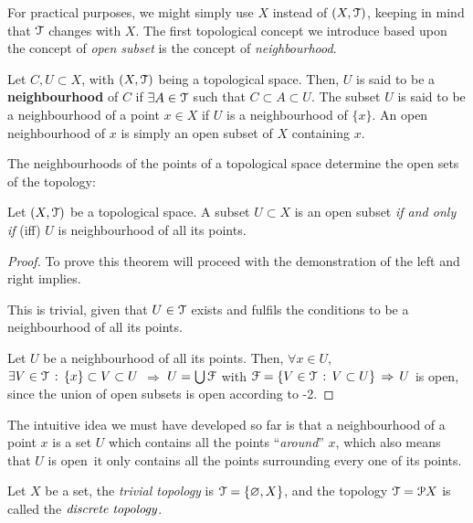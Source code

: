 For practical purposes, we might simply use $X$ instead of $(X, \EuScript{T})$, keeping in mind
that $\EuScript{T}$ changes with $X$.
The first topological concept we introduce based upon the concept of \emph{open subset} is
the concept of \emph{neighbourhood}.

\begin{definition}
	\label{def:neighbourhood}
	Let $C, U\subset X$, with $(X, \EuScript{T})$ being a topological space.
	Then, $U$ is said to
	be a \textbf{neighbourhood} of $C$ if $\exists A\in\EuScript{T}$ such that $C\subset A \subset U$.
	The subset $U$ is said to be a neighbourhood of a point $x\in X$ if $U$ is a
	neighbourhood of $\{x\}$.
	An open neighbourhood of $x$ is simply an open subset of $X$ containing $x$.
\end{definition}

The neighbourhoods of the points of a topological space determine the open sets of the topology:

\begin{theorem}
	\label{th:open-subset-neighbourhood}
	Let $(X, \EuScript{T})$ be a topological space.
	A subset $U\subset X$ is an open subset \emph{if and only if} (iff) $U$ is neighbourhood of all its points.
\end{theorem}

\begin{proof} To prove this theorem will proceed with the demonstration of the left and
right implies.

\noindent{$\boxed{\Rightarrow}$} This is trivial, given that $U\in\EuScript{T}$ exists and
fulfils the conditions to be a neighbourhood of all its points.

\noindent{$\boxed{\Leftarrow}$} Let $U$ be a neighbourhood of all its points.
Then, $\forall x\in U$, $\exists V\in \EuScript{T}\,:\,\{x\}\subset V\subset U$ $\Rightarrow$
$U = \bigcup\EuScript{F}$ with $\EuScript{F}=\{V\in\EuScript{T}\,:\,V\subset U\}\,\Rightarrow\,U$ is open, since the union
of open subsets is open according to -2.
\end{proof}

The intuitive idea we must have developed so far is that a neighbourhood of a point $x$ is a set
$U$ which contains all the points ``\emph{around}'' $x$, which also means that $U$ is open
\iff\,it only contains all the points surrounding every one of its points.

\begin{example}
	Let $X$ be a set, the \emph{trivial topology} is $\EuScript{T}=\{\varnothing, X\}$, and the
	topology $\EuScript{T}=\EuScript{P} X$ is called the $\emph{discrete topology}$.
\end{example}

